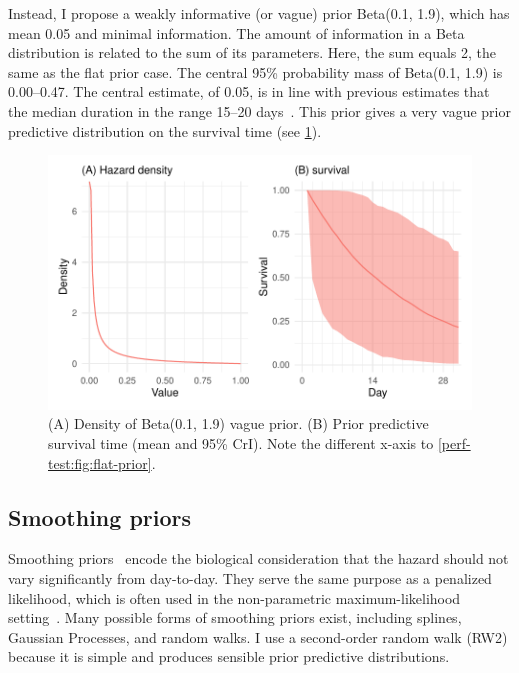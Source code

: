 \documentclass[thesis.tex]{subfiles}
\begin{document}
Instead, I propose a weakly informative (or vague) prior Beta(0.1, 1.9), which has mean 0.05 and minimal information.
The amount of information in a Beta distribution is related to the sum of its parameters.
Here, the sum equals 2, the same as the flat prior case.
The central 95\% probability mass of Beta(0.1, 1.9) is 0.00--0.47.
The central estimate, of 0.05, is in line with previous estimates that the median duration in the range 15--20 days~\autocite{cevikShedding}.
This prior gives a very vague prior predictive distribution on the survival time (see \cref{perf-test:fig:vague-prior}).
\begin{figure}
  \centering \includegraphics{cis-perfect-testing/vague-prior}
  \caption[Vague prior for the hazard]{
    (A) Density of Beta(0.1, 1.9) vague prior.
    (B) Prior predictive survival time (mean and 95\% CrI).
    Note the different x-axis to \cref{perf-test:fig:flat-prior}.
  }
  \label{perf-test:fig:vague-prior}
\end{figure}


\subsection{Smoothing priors}

Smoothing priors~\autocite{gerschSmoothness} encode the biological consideration that the hazard should not vary significantly from day-to-day.
They serve the same purpose as a penalized likelihood, which is often used in the non-parametric maximum-likelihood setting~\autocite[e.g.][]{bacchettiNonparametric}.
Many possible forms of smoothing priors exist, including splines, Gaussian Processes, and random walks.
I use a second-order random walk (RW2) because it is simple and produces sensible prior predictive distributions.
\end{document}
